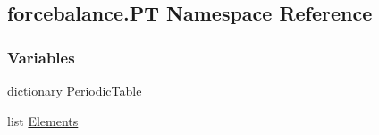\hypertarget{namespaceforcebalance_1_1PT}{\subsection{forcebalance.\-P\-T Namespace Reference}
\label{namespaceforcebalance_1_1PT}
}
\subsubsection*{Variables}
\begin{DoxyCompactItemize}
\item 
dictionary \hyperlink{namespaceforcebalance_1_1PT_add93d0f44e03bbcfac4486fed879bcbe}{Periodic\-Table}
\item 
list \hyperlink{namespaceforcebalance_1_1PT_a0f13655c53f6d777f685d23e1a06ba57}{Elements}
\end{DoxyCompactItemize}


